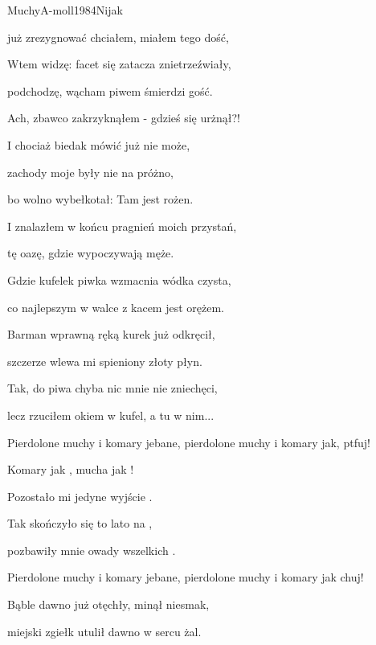 \documentclass[a4paper,draft]{book}
\begin{document}
\begin{song}{Muchy}{A-moll}{1984}{Nijak}{}{}
\begin{SBVerse}
	już zrezygnować chciałem, miałem tego dość,

	Wtem widzę: facet się zatacza znietrzeźwiały,

	podchodzę, wącham piwem śmierdzi gość.
	\end{SBVerse}
	\begin{SBVerse}
	Ach, zbawco zakrzyknąłem - gdzieś się urżnął?!

	I chociaż biedak mówić już nie może,

	zachody moje były nie na próżno,

	bo wolno wybełkotał: Tam jest rożen.
	\end{SBVerse}
	\begin{SBVerse}
	I znalazłem w końcu pragnień moich przystań,

	tę oazę, gdzie wypoczywają męże.

	Gdzie kufelek piwka wzmacnia wódka czysta,

	co najlepszym w walce z kacem jest orężem.
	\end{SBVerse}
	\begin{SBVerse}
	Barman wprawną ręką kurek już odkręcił,

	szczerze wlewa mi spieniony złoty płyn.

	Tak, do piwa chyba nic mnie nie zniechęci,

	lecz rzuciłem okiem w kufel, a tu w nim...
	\end{SBVerse}

	\begin{SBChorus}
	Pierdolone muchy i komary jebane, pierdolone muchy i komary jak, ptfuj!
	\end{SBChorus}

	\begin{SBVerse}
	Komary jak , mucha jak !

	Pozostało mi jedyne wyjście .

	Tak skończyło się to lato na ,

	pozbawiły mnie owady wszelkich .
	\end{SBVerse}

	\begin{SBChorus}
	Pierdolone muchy i komary jebane, pierdolone muchy i komary jak chuj!
	\end{SBChorus}

	\begin{SBVerse}
	Bąble dawno już otęchły, minął niesmak,

	miejski zgiełk utulił dawno w sercu żal.


\end{SBVerse}
\end{song}
\end{document}

